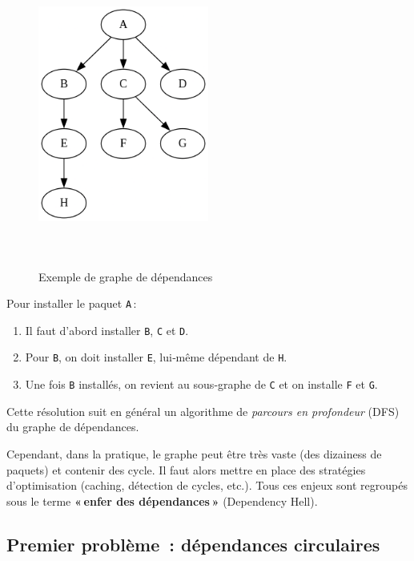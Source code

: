 \begin{figure}[H]
  \centering
  \includegraphics[width=0.5\textwidth , height=10cm]{images_pfe/genralgraphexemple.png}
  \caption{Exemple de graphe de dépendances}
  \label{fig:exempledepndencygraph}
\end{figure}


Pour installer le paquet \texttt{A} :
\begin{enumerate}
  \item Il faut d’abord installer \texttt{B}, \texttt{C} et \texttt{D}.
  \item Pour \texttt{B}, on doit installer \texttt{E}, lui‑même dépendant de \texttt{H}.
  \item Une fois \texttt{B}  installés, on revient au sous‑graphe de \texttt{C} et on installe \texttt{F} et \texttt{G}.
\end{enumerate}

Cette résolution suit en général un algorithme de \emph{parcours en profondeur} (DFS) du graphe de dépendances.  

Cependant, dans la pratique, le graphe peut être très vaste (des dizainess de paquets) et contenir  des cycle. Il faut alors mettre en place des stratégies d’optimisation (caching, détection de cycles, etc.). Tous ces enjeux sont regroupés sous le terme \textbf{« enfer des dépendances »} (Dependency Hell).


\subsection{Premier problème : dépendances circulaires}
\label{subsec:circular-dependencies}

